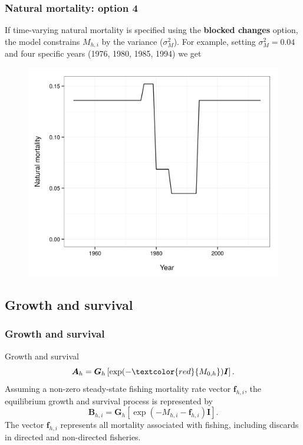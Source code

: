 \documentclass{beamer}
\begin{document}
\begin{frame}
\frametitle{Natural mortality: option 4}
If time-varying natural mortality is specified using the {\bf blocked changes}
option, the model constrains $M_{h,i}$ by the variance ($\sigma^2_M$). For
example, setting $\sigma^2_M = 0.04$ and four specific years (1976, 1980, 1985,
1994) we get
\begin{figure}[!htbp]
  \centering
  \includegraphics[width=0.65\linewidth]{figure/M_t_block.png}
\end{figure}
\end{frame}


\subsection{Growth and survival}
\begin{frame}
\frametitle{Growth and survival}
Growth and survival
\begin{equation*}
  \boldsymbol{A}_{h} = \boldsymbol{G}_h \left[ \exp (-\textcolor{red}{M_{0,h}})
    \boldsymbol{I} \right].
\end{equation*}
Assuming a non-zero steady-state fishing mortality rate vector
$\boldsymbol{f}_{h,i}$, the equilibrium growth and survival process is
represented by
\begin{equation*}
  \boldsymbol{B}_{h,i} = \boldsymbol{G}_h \left[ \exp (-M_{h,i} -
    \boldsymbol{f}_{h,i}) \boldsymbol{I} \right].
\end{equation*}
The vector $\boldsymbol{f}_{h,i}$ represents all mortality associated with
fishing, including discards in directed and non-directed fisheries.
\end{frame}

\end{document}
